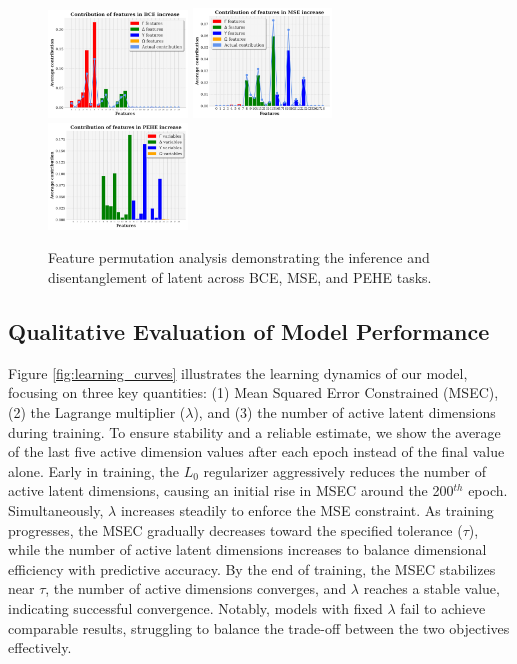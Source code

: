\documentclass[doubleblind]{ecai}
\begin{document}
	\begin{figure}
		\centering
		
		\includegraphics[width=0.33\textwidth]{Images/bce_increase_new.png}
		\includegraphics[width=0.33\textwidth]{Images/mse_increase_new.png}
		\includegraphics[width=0.33\textwidth]{Images/pehe_increase_new.png}
		
		
		\caption{Feature permutation analysis demonstrating the inference and disentanglement of latent across BCE, MSE, and PEHE tasks.}
		
		\label{fig:permutation}
		
	\end{figure}
	
	\subsection{Qualitative Evaluation of Model Performance}
	
	Figure \ref{fig:learning_curves} illustrates the learning dynamics of our model, focusing on three key quantities: (1) Mean Squared Error Constrained (MSEC), (2) the Lagrange multiplier ($\lambda$), and (3) the number of active latent dimensions during training. To ensure stability and a reliable estimate, we show the average of the last five active dimension values after each epoch instead of the final value alone. Early in training, the $L_0$ regularizer aggressively reduces the number of active latent dimensions, causing an initial rise in MSEC around the 200$^{th}$ epoch. Simultaneously, $\lambda$ increases steadily to enforce the MSE constraint. As training progresses, the MSEC gradually decreases toward the specified tolerance ($\tau$), while the number of active latent dimensions increases to balance dimensional efficiency with predictive accuracy. By the end of training, the MSEC stabilizes near $\tau$, the number of active dimensions converges, and $\lambda$ reaches a stable value, indicating successful convergence. Notably, models with fixed $\lambda$ fail to achieve comparable results, struggling to balance the trade-off between the two objectives effectively. 
	
\end{document}
